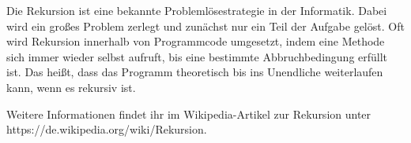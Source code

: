 Die Rekursion ist eine bekannte Problemlösestrategie in der Informatik. Dabei wird ein großes Problem zerlegt und zunächst nur ein Teil der Aufgabe gelöst. Oft wird Rekursion innerhalb von Programmcode umgesetzt, indem eine Methode sich immer wieder selbst aufruft, bis eine bestimmte Abbruchbedingung erfüllt ist. Das heißt, dass das Programm theoretisch bis ins Unendliche weiterlaufen kann, wenn es rekursiv ist. 

Weitere Informationen findet ihr im Wikipedia-Artikel zur Rekursion unter https://de.wikipedia.org/wiki/Rekursion.